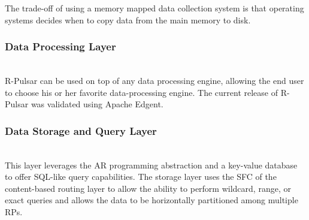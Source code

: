 The trade-off of using a memory mapped data collection system is that operating systems decides when to copy data from the main memory to disk. %

\begin{table}[h!]
\centering

\caption{Measurements of Disk I/O vs RAM memory performance on a Raspberry Pi.} \label{tb:table}
\vspace{-2ex}
\end{table}

\vspace{1.5ex}
\subsubsection{Data Processing Layer}
\hfill\\
R-Pulsar can be used on top of any data processing engine, allowing the end user to choose his or her favorite data-processing engine. The current release of R-Pulsar was validated using Apache Edgent. 

\vspace{1.5ex}
\subsubsection{Data Storage and Query Layer}
\hfill\\
This layer leverages the AR programming abstraction and a key-value database to offer SQL-like query capabilities. The storage layer uses the SFC of the content-based routing layer to allow the ability to perform wildcard, range, or exact queries and allows the data to be horizontally partitioned among multiple RPs. 

